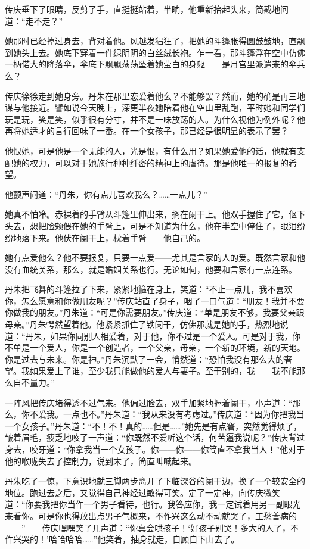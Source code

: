 \par 传庆垂下了眼睛，反剪了手，直挺挺站着，半晌，他重新抬起头来，简截地问道：“走不走？”
\par 她那时已经掉过身去，背对着他。风越发猖狂了，把她的斗篷胀得圆鼓鼓地，直飘到她头上去。她底下穿着一件绿阴阴的白丝绒长袍。乍一看，那斗篷浮在空中仿佛一柄偌大的降落伞，伞底下飘飘荡荡坠着她莹白的身躯——是月宫里派遣来的伞兵么？
\par 传庆徐徐走到她身旁。丹朱在那里恋爱着他么？不能够罢？然而，她的确是再三地谋与他接近。譬如说今天晚上，深更半夜她陪着他在空山里乱跑，平时她和同学们玩是玩，笑是笑，似乎很有分寸，并不是一味放荡的人。为什么视他为例外呢？他再将她适才的言行回味了一番。在一个女孩子，那已经是很明显的表示了罢？
\par 他恨她，可是他是一个无能的人，光是恨，有什么用？如果她爱他的话，他就有支配她的权力，可以对于她施行种种纤密的精神上的虐待。那是他唯一的报复的希望。
\par 他颤声问道：“丹朱，你有点儿喜欢我么？……一点儿？”
\par 她真不怕冷。赤裸着的手臂从斗篷里伸出来，搁在阑干上。他双手握住了它，伛下头去，想把脸颊偎在她的手臂上，可是不知道为什么，他在半空中停住了，眼泪纷纷地落下来。他伏在阑干上，枕着手臂——他自己的。
\par 她有点爱他么？他不要报复，只要一点爱——尤其是言家的人的爱。既然言家和他没有血统关系，那么，就是婚姻关系也行。无论如何，他要和言家有一点连系。
\par 丹朱把飞舞的斗篷拉了下来，紧紧地箍在身上，笑道：“不止一点儿，我不喜欢你，怎么愿意和你做朋友呢？”传庆站直了身子，咽了一口气道：“朋友！我并不要你做我的朋友。”丹朱道：“可是你需要朋友。”传庆道：“单是朋友不够。我要父亲跟母亲。”丹朱愕然望着他。他紧紧抓住了铁阑干，仿佛那就是她的手，热烈地说道：“丹朱，如果你同别人相爱着，对于他，你不过是一个爱人。可是对于我，你不单是一个爱人，你是一个创造者，一个父亲，母亲，一个新的环境，新的天地。你是过去与未来。你是神。”丹朱沉默了一会，悄然道：“恐怕我没有那么大的奢望。我如果爱上了谁，至少我只能做他的爱人与妻子。至于别的，我——我不能那么自不量力。”
\par 一阵风把传庆堵得透不过气来。他偏过脸去，双手加紧地握着阑干，小声道：“那么，你不爱我。一点也不。”丹朱道：“我从来没有考虑过。”传庆道：“因为你把我当一个女孩子。”丹朱道：“不！不！真的……但是……”她先是有点窘，突然觉得烦了，皱着眉毛，疲乏地咳了一声道：“你既然不爱听这个话，何苦逼我说呢？”传庆背过身去，咬牙道：“你拿我当一个女孩子。你——你——你简直不拿我当人！”他对于他的喉咙失去了控制力，说到末了，简直叫喊起来。
\par 丹朱吃了一惊，下意识地就三脚两步离开了下临深谷的阑干边，换了一个较安全的地位。跑过去之后，又觉得自己神经过敏得可笑。定了一定神，向传庆微笑道：“你要我把你当作一个男子看待，也行。我答应你，我一定试着用另一副眼光来看你。可是你也得放出点男子气概来，不作兴这么动不动就哭了，工愁善病的——”——传庆嘿嘿笑了几声道：“你真会哄孩子！‘好孩子别哭！多大的人了，不作兴哭的！’哈哈哈哈……”他笑着，抽身就走，自顾自下山去了。
